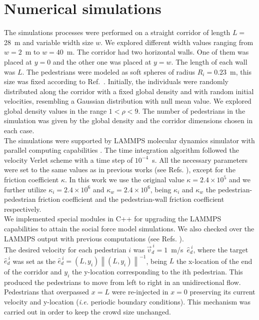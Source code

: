 \section{\label{simulations}Numerical simulations}

The simulations processes were performed on a straight corridor of length $L=$ 28~m and variable width size $w$. We explored different width values ranging from $w=2$~m to $w=40$~m. The corridor had two horizontal walls. One of them was placed at $y=0$ and the other one was placed at $y=w$. The length of each wall was $L$. The pedestrians were modeled as soft spheres of radius $R_i=0.23$~m, this size was fixed according to Ref.~\cite{metric_handbook}. Initially, the individuals were randomly distributed along the corridor with a fixed global density and with random initial velocities, resembling a Gaussian distribution with null mean value. We explored global density values in the range $1<\rho<9$. The number of pedestrians in the simulation was given by the global density and the corridor dimensions chosen in each case. \\

The simulations were supported by LAMMPS molecular dynamics simulator with parallel computing capabilities \cite{plimpton}.
The time integration algorithm followed the velocity Verlet scheme with a time step of $10^{-4}$~s. All the necessary parameters
were set to the same values as in previous works (see Refs. \cite{sticco,Dorso5}), except for the friction coefficient $\kappa$. In this work we use the original value $\kappa=2.4 \times 10^{5}$ and we further utilize $\kappa_i=2.4 \times 10^{6}$ and $\kappa_w=2.4 \times 10^{6}$, being $\kappa_i$ and $\kappa_w$ the pedestrian-pedestrian friction coefficient and the pedestrian-wall friction coefficient respectively. \\

We implemented special modules in C++ for upgrading the LAMMPS capabilities to attain the social force model simulations. We also checked over the LAMMPS output with previous computations (see Refs. \cite{Dorso1, Dorso2,Dorso3, Dorso4,Dorso6}).\\

The desired velocity for each pedestrian $i$ was $\vec{v}_d^{~i}=1$~m/s~$\hat{e}_d^{~i}$, where the target $\hat{e}_d^{~i}$ was set as the $\hat{e}_d^{~i}=(L,y_i)\left \| (L,y_i) \right \|^{-1}$, being $L$ the x-location of the end of the corridor and $y_i$ the y-location corresponding to the ith pedestrian. This produced the pedestrians to move from left to right in an unidirectional flow. Pedestrians that overpassed $x=L$ were re-injected in $x=0$ preserving its current velocity and y-location (\textit{i.e.} periodic boundary conditions). This mechanism was carried out in order to keep
the crowd size unchanged.\\

